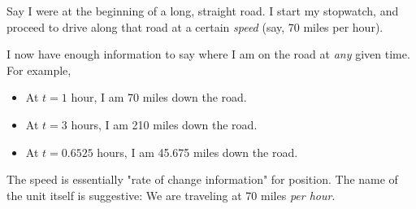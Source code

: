 \documentclass{article}
\begin{document}








Say I were at the beginning of a long, straight road. I start my stopwatch, and proceed to drive along that road at a certain \emph{speed} (say, 70 miles per hour). 

I now have enough information to say where I am on the road at \emph{any} given time. For example, 

\begin{itemize}
\item At $t = 1$ hour, I am 70 miles down the road.
\item At $t = 3$ hours, I am 210 miles down the road.
\item At $t = 0.6525$ hours, I am 45.675 miles down the road.
\end{itemize}

The speed is essentially "rate of change information" for position. The name of the unit itself is suggestive: We are traveling at 70 miles \emph{per hour}.




\end{document}
